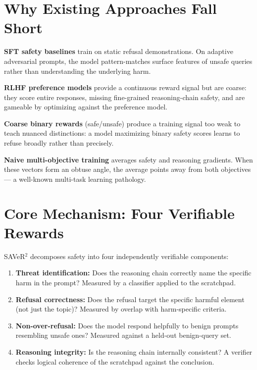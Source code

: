 \documentclass[10pt,twocolumn]{article}
\begin{document}
\section{Why Existing Approaches Fall Short}

\textbf{SFT safety baselines} train on static refusal demonstrations.
On adaptive adversarial prompts, the model pattern-matches surface features of unsafe queries rather than understanding the underlying harm.

\textbf{RLHF preference models} provide a continuous reward signal but are coarse: they score entire responses, missing fine-grained reasoning-chain safety, and are gameable by optimizing against the preference model.

\textbf{Coarse binary rewards} (safe/unsafe) produce a training signal too weak to teach nuanced distinctions: a model maximizing binary safety scores learns to refuse broadly rather than precisely.

\textbf{Naive multi-objective training} averages safety and reasoning gradients.
When these vectors form an obtuse angle, the average points away from both objectives --- a well-known multi-task learning pathology.

\section{Core Mechanism: Four Verifiable Rewards}

SAVeR$^2$ decomposes safety into four independently verifiable components:

\begin{enumerate}[leftmargin=1.5em,itemsep=2pt]
  \item \textbf{Threat identification:} Does the reasoning chain correctly name the specific harm in the prompt?
    Measured by a classifier applied to the scratchpad.
  \item \textbf{Refusal correctness:} Does the refusal target the specific harmful element (not just the topic)?
    Measured by overlap with harm-specific criteria.
  \item \textbf{Non-over-refusal:} Does the model respond helpfully to benign prompts resembling unsafe ones?
    Measured against a held-out benign-query set.
  \item \textbf{Reasoning integrity:} Is the reasoning chain internally consistent?
    A verifier checks logical coherence of the scratchpad against the conclusion.
\end{enumerate}
\end{document}
